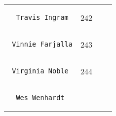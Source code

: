 \documentclass[]{article}
\begin{document}
\begin{longtable}[c]{@{}llll@{}}
\begin{minipage}[t]{0.39\columnwidth}
\begin{verbatim}
  Travis Ingram
\end{verbatim}
\end{minipage} & \begin{minipage}[t]{0.10\columnwidth}\raggedright
242
\end{minipage} & \begin{minipage}[t]{0.13\columnwidth}\raggedright
\end{minipage} & \begin{minipage}[t]{0.15\columnwidth}\raggedright
\end{minipage}
\\\noalign{\medskip}
\begin{minipage}[t]{0.39\columnwidth}\raggedright
\begin{verbatim}
 Vinnie Farjalla
\end{verbatim}
\end{minipage} & \begin{minipage}[t]{0.10\columnwidth}\raggedright
243
\end{minipage} & \begin{minipage}[t]{0.13\columnwidth}\raggedright
\end{minipage} & \begin{minipage}[t]{0.15\columnwidth}\raggedright
\end{minipage}
\\\noalign{\medskip}
\begin{minipage}[t]{0.39\columnwidth}\raggedright
\begin{verbatim}
 Virginia Noble
\end{verbatim}
\end{minipage} & \begin{minipage}[t]{0.10\columnwidth}\raggedright
244
\end{minipage} & \begin{minipage}[t]{0.13\columnwidth}\raggedright
\end{minipage} & \begin{minipage}[t]{0.15\columnwidth}\raggedright
\end{minipage}
\\\noalign{\medskip}
\begin{minipage}[t]{0.39\columnwidth}\raggedright
\begin{verbatim}
  Wes Wenhardt
\end{verbatim}
\end{minipage} & \begin{minipage}[t]{0.10\columnwidth}\raggedright

\end{minipage}
\end{longtable}
\end{document}
